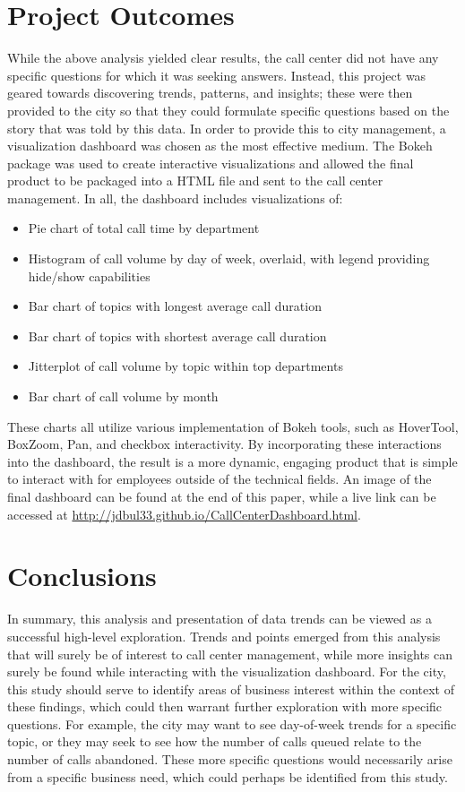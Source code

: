 \documentclass{article}
\begin{document}
\section{Project Outcomes}

While the above analysis yielded clear results, the call center did not have any specific questions for which it was seeking answers.  Instead, this project was geared towards discovering trends, patterns, and insights; these were then provided to the city so that they could formulate specific questions based on the story that was told by this data.  In order to provide this to city management, a visualization dashboard was chosen as the most effective medium.  The Bokeh package was used to create interactive visualizations and allowed the final product to be packaged into a HTML file and sent to the call center management.  In all, the dashboard includes visualizations of:

\begin{itemize}
  \item{Pie chart of total call time by department}
  \item{Histogram of call volume by day of week, overlaid, with legend providing hide/show capabilities}
  \item{Bar chart of topics with longest average call duration}
  \item{Bar chart of topics with shortest average call duration}
  \item{Jitterplot of call volume by topic within top departments}
  \item{Bar chart of call volume by month}
\end{itemize}

These charts all utilize various implementation of Bokeh tools, such as HoverTool, BoxZoom, Pan, and checkbox interactivity.  By incorporating these interactions into the dashboard, the result is a more dynamic, engaging product that is simple to interact with for employees outside of the technical fields.  An image of the final dashboard can be found at the end of this paper, while a live link can be accessed at \href{http://jdbul33.github.io/CallCenterDashboard.html}{http://jdbul33.github.io/CallCenterDashboard.html}.


\section{Conclusions}

In summary, this analysis and presentation of data trends can be viewed as a successful high-level exploration.  Trends and points emerged from this analysis that will surely be of interest to call center management, while more insights can surely be found while interacting with the visualization dashboard.  For the city, this study should serve to identify areas of business interest within the context of these findings, which could then warrant further exploration with more specific questions.  For example, the city may want to see day-of-week trends for a specific topic, or they may seek to see how the number of calls queued relate to the number of calls abandoned.  These more specific questions would necessarily arise from a specific business need, which could perhaps be identified from this study.
\end{document}
